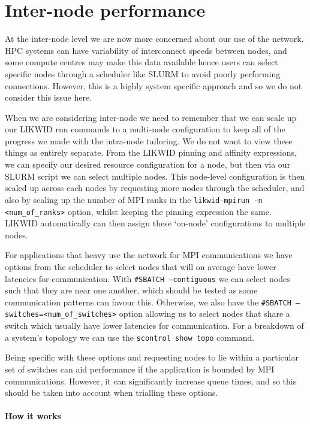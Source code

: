 \section{Inter-node performance}
\label{section:tailoring:inter-node}

At the inter-node level we are now more concerned about our use of the network.
HPC systems can have variability of interconnect speeds between nodes, and some
compute centres may make this data available hence users can select specific
nodes through a scheduler like SLURM to avoid poorly performing connections.
However, this is a highly system specific approach and so we do not consider
this issue here.

When we are considering inter-node we need to remember that we can scale up our
LIKWID run commands to a multi-node configuration to keep all of the progress
we made with the intra-node tailoring. We do not want to view these things as
entirely separate. From the LIKWID pinning and affinity expressions, we can
specify our desired resource configuration for a node, but then via our SLURM
script we can select multiple nodes. This node-level configuration is then
scaled up across each nodes by requesting more nodes through the scheduler, and
also by scaling up the number of MPI ranks in the \texttt{likwid-mpirun -n
<num\_of\_ranks>} option, whilst keeping the pinning expression the same.
LIKWID automatically can then assign these `on-node' configurations to multiple
nodes.

For applications that heavy use the network for MPI communications we have
options from the scheduler to select nodes that will on average have lower
latencies for communication. With \texttt{\#SBATCH --contiguous} we can select
nodes such that they are near one another, which should be tested as some
communication patterns can favour this. Otherwise, we also have the
\texttt{\#SBATCH --switches=<num\_of\_switches>} option allowing us to select
nodes that share a switch which usually have lower latencies for communication.
For a breakdown of a system's topology we can use the \texttt{scontrol show
topo} command.

Being specific with these options and requesting nodes to lie within a
particular set of switches can aid performance if the application is bounded by
MPI communications. However, it can significantly increase queue times, and so
this should be taken into account when trialling these options.

\paragraph*{How it works}


